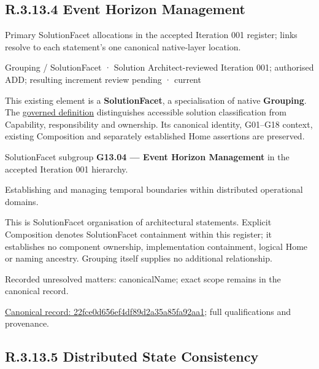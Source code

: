 \subsection*{R.3.13.4 Event Horizon Management}
\label{navigation:R.3.13.4}

Primary SolutionFacet allocations in the accepted Iteration 001 register; links resolve to each statement’s one canonical native-layer location.\par
\label{element:22fce0d656ef4df89d2a35a85fa92aa1}
{\small Grouping / SolutionFacet · Solution Architect-reviewed Iteration 001; authorised ADD; resulting increment review pending · current}\par

This existing element is a \textbf{SolutionFacet}, a specialisation of native
\textbf{Grouping}. The \href{\detokenize{../../../../../../../governance/continuum-representation.md#solutionfacet-classification--1119-candidate}}{governed definition}
distinguishes accessible solution classification from Capability, responsibility
and ownership. Its canonical identity, G01–G18 context, existing Composition
and separately established Home assertions are preserved.



SolutionFacet subgroup \textbf{G13.04 — Event Horizon Management} in the accepted Iteration 001 hierarchy.



Establishing and managing temporal boundaries within distributed operational domains.



This is SolutionFacet organisation of architectural statements. Explicit Composition denotes SolutionFacet containment within this register; it establishes no component ownership, implementation containment, logical Home or naming ancestry. Grouping itself supplies no additional relationship.


{\small Recorded unresolved matters: canonicalName; exact scope remains in the canonical record.}\par
{\footnotesize \href{../../../../../../../continuum/grouping/22fce0d656ef4df89d2a35a85fa92aa1.md}{Canonical record: 22fce0d656ef4df89d2a35a85fa92aa1}; full qualifications and provenance.}\par
\subsection*{R.3.13.5 Distributed State Consistency}
\label{navigation:R.3.13.5}

